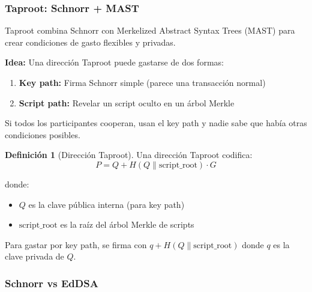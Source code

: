\documentclass[11pt,a4paper,twoside,openright]{book}
\theoremstyle{definition}
\newtheorem{definition}{Definición}[chapter]
\theoremstyle{plain}
\theoremstyle{remark}
\begin{document}
\subsubsection{Taproot: Schnorr + MAST}

\begin{intuicion}
Taproot combina Schnorr con Merkelized Abstract Syntax Trees (MAST) para crear condiciones de gasto flexibles y privadas.

\textbf{Idea:} Una dirección Taproot puede gastarse de dos formas:
\begin{enumerate}
    \item \textbf{Key path:} Firma Schnorr simple (parece una transacción normal)
    \item \textbf{Script path:} Revelar un script oculto en un árbol Merkle
\end{enumerate}

Si todos los participantes cooperan, usan el key path y nadie sabe que había otras condiciones posibles.
\end{intuicion}

\begin{definition}[Dirección Taproot]
Una dirección Taproot codifica:
\[ P = Q + H(Q \| \text{script\_root}) \cdot G \]

donde:
\begin{itemize}
    \item $Q$ es la clave pública interna (para key path)
    \item $\text{script\_root}$ es la raíz del árbol Merkle de scripts
\end{itemize}

Para gastar por key path, se firma con $q + H(Q \| \text{script\_root})$ donde $q$ es la clave privada de $Q$.
\end{definition}

\subsubsection{Schnorr vs EdDSA}
\end{document}
